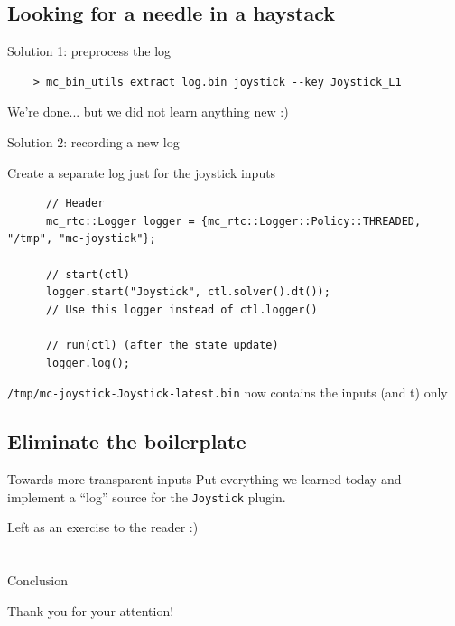 \documentclass[c,aspectratio=169]{beamer}
\begin{document}
\subsection{Looking for a needle in a haystack}

\begin{frame}[fragile]{Solution 1: preprocess the log}
  \scriptsize
  \begin{verbatim}
    > mc_bin_utils extract log.bin joystick --key Joystick_L1
  \end{verbatim}

  \vfill

  \normalsize

  We're done... \pause but we did not learn anything new :)
\end{frame}

\begin{frame}[fragile]{Solution 2: recording a new log}
  \begin{block}{Create a separate log just for the joystick inputs}
    \scriptsize
    \begin{verbatim}
      // Header
      mc_rtc::Logger logger = {mc_rtc::Logger::Policy::THREADED, "/tmp", "mc-joystick"};

      // start(ctl)
      logger.start("Joystick", ctl.solver().dt());
      // Use this logger instead of ctl.logger()

      // run(ctl) (after the state update)
      logger.log();
    \end{verbatim}
  \end{block}
  \vfill
  \verb|/tmp/mc-joystick-Joystick-latest.bin| now contains the inputs (and t) only
\end{frame}

\subsection{Eliminate the boilerplate}
\begin{frame}[fragile]{Towards more transparent inputs}
  Put everything we learned today and implement a ``log'' source for the \verb|Joystick| plugin.

  \vfill

  \pause

  Left as an exercise to the reader :)
\end{frame}

\section{}

\begin{frame}{Conclusion}
  \begin{center}
    Thank you for your attention!
  \end{center}
\end{frame}
\end{document}
